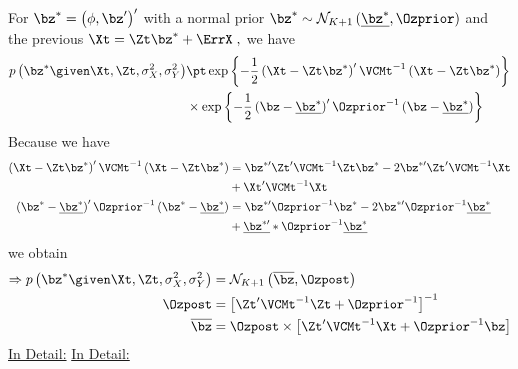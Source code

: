 For $\bz^*=\left(\phi,\bz^{\prime}\right)^{\prime}$ with a normal prior $\bz^*\sim\mathcal{N}_{K+1}\left(\underline{\bz^*}, \Ozprior\right)$ and the previous $\Xt=\Zt\bz^* + \ErrX\;,$ we have
\begin{align*}
p\left(\bz^*\given \Xt,\Zt,\sigma_X^2,\sigma_Y^2\right) 
& \pt
\exp\left\lbrace-\frac{1}{2}\left(\Xt-\Zt\bz^*\right)^{\prime}\VCMt^{-1}\left(\Xt-\Zt\bz^*\right)\right\rbrace\\
& \times 
\exp\left\lbrace-\frac{1}{2}\left(\bz-\underline{\bz^*}\right)^{\prime}\Ozprior^{-1}\left(\bz-\underline{\bz^*}\right)\right\rbrace\\
\end{align*}
Because we have
\begin{align*}
\left(\Xt-\Zt\bz^*\right)^{\prime}\VCMt^{-1}\left(\Xt-\Zt\bz^*\right)
& =
\bz^{*\prime}\Zt^{\prime}\VCMt^{-1}\Zt\bz^{*}-2\bz^{*\prime}\Zt^{\prime}\VCMt^{-1}\Xt\\
& + \Xt^{\prime}\VCMt^{-1}\Xt
\\
\left(\bz^*-\underline{\bz^*}\right)^{\prime}\Ozprior^{-1}\left(\bz^*-\underline{\bz^*}\right) 
& = 
\bz^{*\prime}\Ozprior^{-1}\bz^*
-2\bz^{*\prime}\Ozprior^{-1}\underline{\bz^*}\\
& +
\underline{\bz^{*\prime}}*\Ozprior^{-1}\underline{\bz^*}
\end{align*}
we obtain
\begin{align*}
\Rightarrow 
p\left(\bz^*\given \Xt,\Zt,\sigma_X^2,\sigma_Y^2\right)
&=
\mathcal{N}_{K+1}\left(\overline{\bz},\Ozpost\right)\;\\
\Ozpost
& =
\left[\Zt^{\prime}\VCMt^{-1}\Zt+\Ozprior^{-1}\right]^{-1} \\
\overline{\bz}
& =
\Ozpost\times\left[\Zt^{\prime}\VCMt^{-1}\Xt+\Ozprior^{-1}\bz\right]
\end{align*}
%
%
%
%
%
\clearpage
\underline{In Detail:}
%
%
%
%
%
\clearpage
\underline{In Detail:}